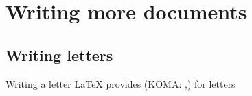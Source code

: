 \section{Writing more documents}
\subsection{Writing letters}
\begin{frame}
	\begin{block}{Writing a letter}
		{\LaTeX} provides  (KOMA: ,) for letters
	\end{block}

\end{frame}


